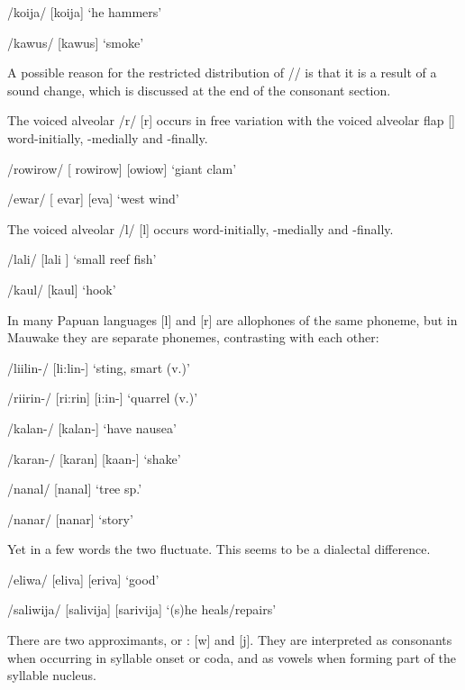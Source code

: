 /ko{\textphi}ija/  [ko{{\textprimstress}}{\textphi}ija]  `he hammers'

/kawus/  [ka{{\textprimstress}wus}]  `smoke'

A possible reason for the restricted distribution of /{\textphi}/ is that it is a result of a sound change, which is discussed at the end of the consonant section.

The voiced alveolar  /r/ [r] occurs in free variation with the voiced alveolar flap [{\textfishhookr}] word-initially, -medially and -finally.  

/rowirow/  [ ro{{\textprimstress}wirow}] {\Tilde} [{\textfishhookr}o{{\textprimstress}wi}{\textfishhookr}ow]  `giant clam'

/ewar/  [ e{{\textprimstress}var}] {\Tilde} [e{{\textprimstress}va}{\textfishhookr}]  `west wind'

The voiced alveolar  /l/ [l] occurs word-initially, -medially and -finally. 

/lali/  [la{{\textprimstress}li} ]  `small reef fish'

/kaul/  [{{\textprimstress}kaul}]  `hook'

In many Papuan languages [l] and [r] are allophones of the same phoneme, but in Mauwake they are separate phonemes, contrasting with each other:

/liilin-/  [li:lin-]  `sting, smart (v.)'

/riirin-/  [{{\textprimstress}ri:rin}] {\Tilde} [{{\textprimstress}}{\textfishhookr}i:{\textfishhookr}in-]  `quarrel (v.)'

/kalan-/  [ka{{\textprimstress}lan}-]  `have nausea' 

/karan-/  [ka{{\textprimstress}ran}] {\Tilde} [ka{{\textprimstress}}{\textfishhookr}an-]  `shake'

/nanal/  [na{{\textprimstress}nal}]  `tree sp.'

/nanar/  [na{{\textprimstress}nar}]  `story'

Yet in a few words the two fluctuate. This seems to be a dialectal difference.

/eliwa/  [e{{\textprimstress}liva}] {\Tilde} [e{{\textprimstress}riva}]  `good'

/saliwija/  [sa{{\textprimstress}livija}] {\Tilde} [sa{{\textprimstress}rivija}]  `(s)he heals/repairs'

There are two approximants, or : [w] and [j].  They are interpreted as consonants when occurring in syllable onset or coda, and as vowels when forming part of the syllable nucleus. 

